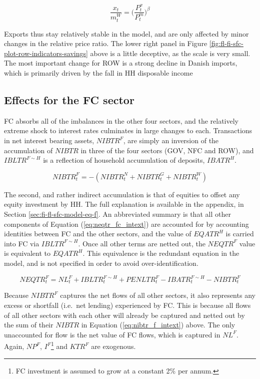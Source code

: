 \documentclass[
]{book}
\begin{document}
\begin{equation}
\frac{x_t}{m^W_t} = \Bigg( \frac{P^x_t}{P^m_t}\Bigg)^ \beta
\end{equation}

Exports thus stay relatively stable in the model, and are only affected by minor changes in the relative price ratio. The lower right panel in Figure \ref{fig:fl-fi-sfc-plot-row-indicators-savings} above is a little deceptive, as the scale is very small. The most important change for ROW is a strong decline in Danish imports, which is primarily driven by the fall in HH disposable income

\hypertarget{effects-for-the-fc-sector}{%
\subsection{Effects for the FC sector}\label{effects-for-the-fc-sector}}

FC absorbs all of the imbalances in the other four sectors, and the relatively extreme shock to interest rates culminates in large changes to each. Transactions in net interest bearing assets, \(NIBTR^F\), are simply an inversion of the accumulation of \(NIBTR\) in three of the four sectors (GOV, NFC and ROW), and \(IBLTR^{F\sim H}\) is a reflection of household accumulation of deposits, \(IBATR^H\).

\begin{equation}
NIBTR^F_t = -(NIBTR^N_t + NIBTR^G_t + NIBTR^W_t )
\label{eq:nibtr_f_intext}
\end{equation}

The second, and rather indirect accumulation is that of equities to offset any equity investment by HH. The full explanation is available in the appendix, in Section \ref{sec:fi-fl-sfc-model-eq-f}. An abbreviated summary is that all other components of Equation (\ref{eq:neqtr_fc_intext}) are accounted for by accounting identities between FC and the other sectors, and the value of \(EQATR^H\) is carried into FC via \(IBLTR^{F\sim H}\). Once all other terms are netted out, the \(NEQTR^F\) value is equivalent to \(EQATR^H\). This equivalence is the redundant equation in the model, and is not specified in order to avoid over-identification.

\begin{equation}
NEQTR^F_t = NL^F_t + IBLTR^{F\sim H}_t + PENLTR^F_t - IBATR^{F\sim H}_t - NIBTR^F_t
\label{eq:neqtr_fc_intext}
\end{equation}

Because \(NIBTR^F\) captures the net flows of all other sectors, it also represents any excess or shortfall (i.e.~net lending) experienced by FC. This is because all flows of all other sectors with each other will already be captured and netted out by the sum of their \(NIBTR\) in Equation (\ref{eq:nibtr_f_intext}) above. The only unaccounted for flow is the net value of FC flows, which is captured in \(NL^F\). Again, \(NP^F\), \(I^F\)\footnote{FC investment is assumed to grow at a constant 2\% per annum.} and \(KTR^F\) are exogenous.
\end{document}
